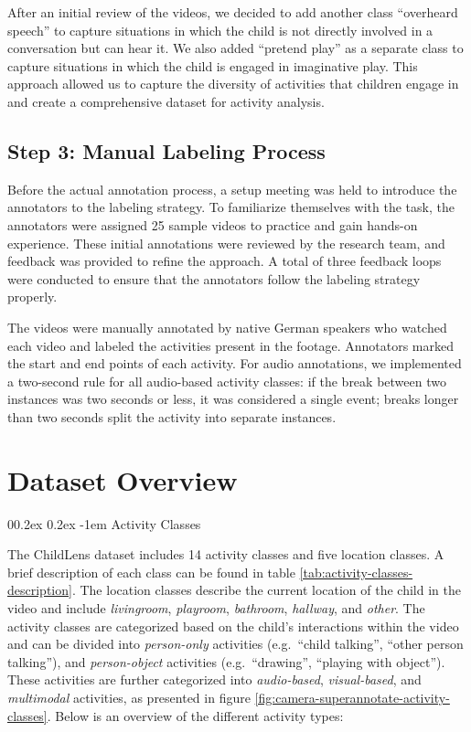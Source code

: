 \documentclass[
  man,floatsintext]{apa6}
\makeatletter
\let\oldparagraph\paragraph
\renewcommand{\paragraph}{
    \@ifstar
      \xxxParagraphStar
      \xxxParagraphNoStar
  }
\newcommand{\xxxParagraphStar}[1]{\oldparagraph*{#1}\mbox{}}
\newcommand{\xxxParagraphNoStar}[1]{\oldparagraph{#1}\mbox{}}
\renewcommand{\paragraph}{\@startsection{paragraph}{4}{\parindent}%
  {0\baselineskip \@plus 0.2ex \@minus 0.2ex}%
  {-1em}%
  {\normalfont\normalsize\bfseries\itshape\typesectitle}}
\makeatother
\begin{document}
After an initial review of the videos, we decided to add another class ``overheard speech'' to capture situations in which the child is not directly involved in a conversation but can hear it. We also added ``pretend play'' as a separate class to capture situations in which the child is engaged in imaginative play. This approach allowed us to capture the diversity of activities that children engage in and create a comprehensive dataset for activity analysis.

\subsection{Step 3: Manual Labeling Process}\label{step-3-manual-labeling-process}

Before the actual annotation process, a setup meeting was held to introduce the annotators to the labeling strategy. To familiarize themselves with the task, the annotators were assigned 25 sample videos to practice and gain hands-on experience. These initial annotations were reviewed by the research team, and feedback was provided to refine the approach. A total of three feedback loops were conducted to ensure that the annotators follow the labeling strategy properly.

The videos were manually annotated by native German speakers who watched each video and labeled the activities present in the footage. Annotators marked the start and end points of each activity. For audio annotations, we implemented a two-second rule for all audio-based activity classes: if the break between two instances was two seconds or less, it was considered a single event; breaks longer than two seconds split the activity into separate instances.

\section{Dataset Overview}\label{dataset-overview}

\paragraph{Activity Classes}\label{activity-classes}

The ChildLens dataset includes 14 activity classes and five location classes. A brief description of each class can be found in table \ref{tab:activity-classes-description}. The location classes describe the current location of the child in the video and include \emph{livingroom}, \emph{playroom}, \emph{bathroom}, \emph{hallway}, and \emph{other}.
The activity classes are categorized based on the child's interactions within the video and can be divided into \emph{person-only} activities (e.g.~``child talking'', ``other person talking''), and \emph{person-object} activities (e.g.~``drawing'', ``playing with object''). These activities are further categorized into \emph{audio-based}, \emph{visual-based}, and \emph{multimodal} activities, as presented in figure \ref{fig:camera-superannotate-activity-classes}. Below is an overview of the different activity types:
\end{document}
